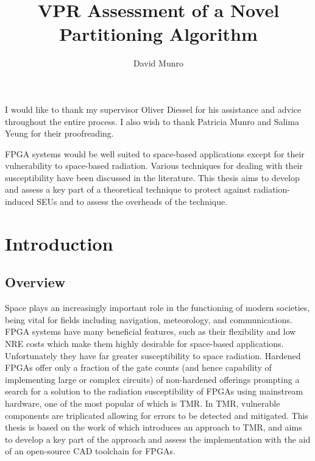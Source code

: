 \documentclass[12pt,final,oneside]{dwThesis} %
\title{VPR Assessment of a Novel Partitioning Algorithm}
\author{David Munro}
\begin{document}
   \maketitle

   \begin{acknowledgements}
      I would like to thank my supervisor Oliver Diessel
      for his assistance and advice throughout the entire process. I also wish
      to thank Patricia Munro and Salima Yeung for their proofreading.


   \end{acknowledgements}

   \begin{abstracts}
      \gls{FPGA} systems would be well
      suited to space-based applications except for their vulnerability to
      space-based radiation. Various techniques for dealing with their
      susceptibility have been discussed in the literature. This thesis aims to
      develop and assess a key part of a theoretical technique to protect
      against radiation-induced \glspl{SEU} and to assess the overheads of the
      technique.  \glsresetall 
   \end{abstracts}
   \newpage \tableofcontents*
   \listoffixmes \newpage \printglossaries 
   \chapter{Introduction}

   \section{Overview}
   Space plays an increasingly
   important role in the functioning of modern societies, being vital for
   fields including navigation, meteorology, and
   communications\cite{OECDSpace}. \gls{FPGA} systems have many beneficial
   features, such as their flexibility and low \gls{NRE} costs which make them
   highly desirable for space-based applications. Unfortunately they have far
   greater susceptibility to space radiation. Hardened \glspl{FPGA} offer only
   a fraction of the gate counts (and hence capability of implementing large or
   complex circuits) of non-hardened offerings prompting a search for a
   solution to the radiation susceptibility of \glspl{FPGA} using mainstream
   hardware\cite{VFPGATMR}, one of the most popular of which is \gls{TMR}. In
   \gls{TMR}, vulnerable components are triplicated allowing for errors to be
   detected and mitigated. This thesis is based on the work
   of\cite{DiesselChange} which introduces an approach to \gls{TMR}, and aims
   to develop a key part of the approach and assess the implementation with the
   aid of an open-source \gls{CAD} toolchain for \glspl{FPGA}.
   
\end{document}

